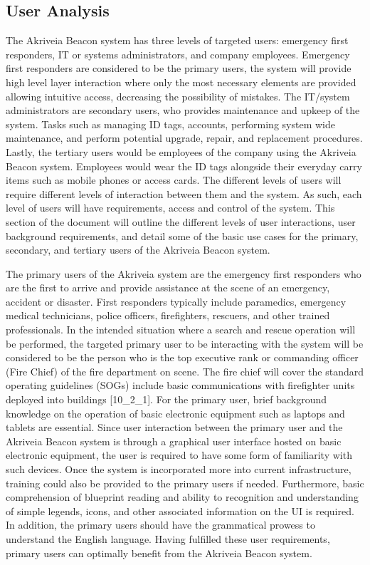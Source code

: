 

\subsection{User Analysis}
\medskip
The Akriveia Beacon system has three levels of targeted users: emergency first responders, IT or systems administrators, and company employees. Emergency first responders are considered to be the primary users, the system will provide high level layer interaction where only the most necessary elements are provided allowing intuitive access, decreasing the possibility of mistakes. The IT/system administrators are secondary users, who provides maintenance and upkeep of the system. Tasks such as managing ID tags, accounts, performing system wide maintenance, and perform potential upgrade, repair, and replacement procedures. Lastly, the tertiary users would be employees of the company using the Akriveia Beacon system. Employees would wear the ID tags alongside their everyday carry items such as mobile phones or access cards. The different levels of users will require different levels of interaction between them and the system. As such, each level of users will have requirements, access and control of the system. This section of the document will outline the different levels of user interactions, user background requirements, and detail some of the basic use cases for the primary, secondary, and tertiary users of the Akriveia Beacon system.

\bigskip
The primary users of the Akriveia system are the emergency first responders who are the first to arrive and provide assistance at the scene of an emergency, accident or disaster. First responders typically include paramedics, emergency medical technicians, police officers, firefighters, rescuers, and other trained professionals. In the intended situation where a search and rescue operation will be performed, the targeted primary user to be interacting with the system will be considered to be the person who is the top executive rank or commanding officer (Fire Chief) of the fire department on scene. The fire chief will cover the standard operating guidelines (SOGs) include basic communications with firefighter units deployed into buildings [10\_2\_1]. For the primary user, brief background knowledge on the operation of basic electronic equipment such as laptops and tablets are essential. Since user interaction between the primary user and the Akriveia Beacon system is through a graphical user interface hosted on basic electronic equipment, the user is required to have some form of familiarity with such devices. Once the system is incorporated more into current infrastructure, training could also be provided to the primary users if needed. Furthermore, basic comprehension of blueprint reading and ability to recognition and understanding of simple legends, icons, and other associated information on the UI is required. In addition, the primary users should have the grammatical prowess to understand the English language. Having fulfilled these user requirements, primary users can optimally benefit from the Akriveia Beacon system.

